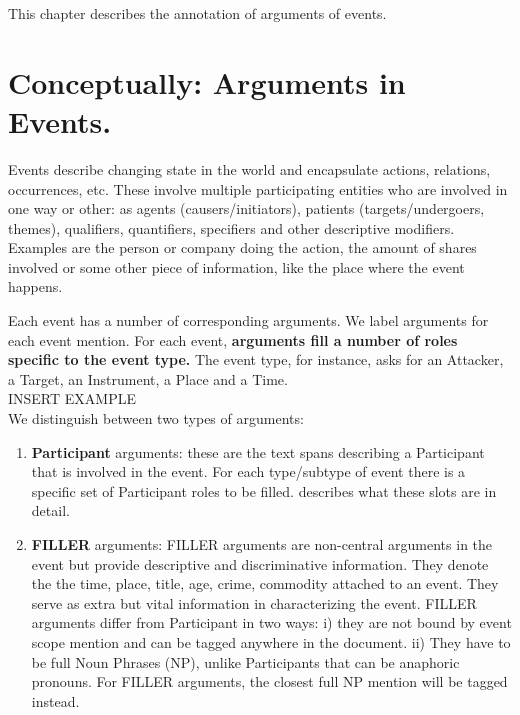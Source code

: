 \setcounter{section}{-1}

This chapter describes the annotation of arguments of events.

\section{Conceptually: Arguments in Events.}
Events describe changing state in the world and encapsulate actions, relations, occurrences, etc.
These involve multiple participating entities who are involved in one way or other:
as agents (causers/initiators), patients (targets/undergoers, themes), qualifiers, quantifiers, specifiers and other descriptive modifiers.
Examples are the person or company doing the action, the amount of shares involved or some other piece of information, like the place where the event happens.

Each event has a number of corresponding arguments.
We label arguments for each event mention.
For each event, \textbf{arguments fill a number of roles specific to the event type.}
The  event type, for instance, asks for an Attacker, a Target, an Instrument, a Place and a Time.\\

INSERT EXAMPLE\\

We distinguish between two types of arguments:
\begin{enumerate}
    \item \textbf{Participant} arguments: these are the text spans describing a Participant that is involved in the event. 
    For each type/subtype of event there is a specific set of Participant roles to be filled.  describes what these slots are in detail.
    \item \textbf{FILLER} arguments:
    FILLER arguments are non-central arguments in the event but provide descriptive and discriminative information.
    They denote the the time, place, title, age, crime, commodity attached to an event.
    They serve as extra but vital information in characterizing the event.
    FILLER arguments differ from Participant in two ways:
    i) they are not bound by event scope mention and can be tagged anywhere in the document.
    ii) They have to be full Noun Phrases (NP), unlike Participants that can be anaphoric pronouns.
    For FILLER arguments, the closest full NP mention will be tagged instead.
\end{enumerate}


